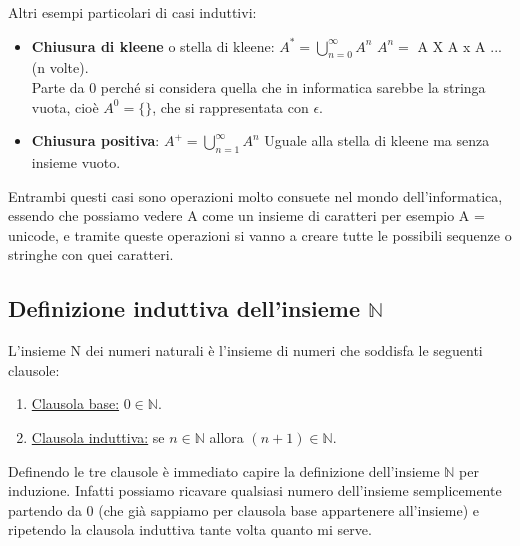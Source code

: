 \begin{example}
    Altri esempi particolari di casi induttivi:
    \begin{itemize}
        \item \textbf{Chiusura di kleene} o stella di kleene: $A^{*} = \bigcup\limits_{n=0}^{\infty} A^n$ \hspace{.3cm} $A^n =$ A X A x A ... (n volte).\\
        Parte da 0 perché si considera quella che in informatica sarebbe la stringa vuota, cioè $A^0 = \{\}$, che si rappresentata con $\epsilon$.
        \item \textbf{Chiusura positiva}: $A^{+} = \bigcup\limits_{n=1}^{\infty} A^n$ \hspace{.3cm} Uguale alla stella di kleene ma senza insieme vuoto.
    \end{itemize}
    Entrambi questi casi sono operazioni molto consuete nel mondo dell'informatica, essendo che possiamo vedere A come un insieme di caratteri per esempio A = unicode, e tramite queste operazioni si vanno a creare tutte le possibili sequenze o stringhe con quei caratteri.
\end{example}

\subsection{Definizione induttiva dell'insieme $\mathbb{N}$}
\begin{definition}\label{definizioni-induttiva-insieme-N}
    L’insieme N dei numeri naturali è l’insieme di numeri che soddisfa le seguenti clausole:
    \begin{enumerate}
        \item \underline{Clausola base:} $0 \in \mathbb{N}$.
        \item \underline{Clausola induttiva:} se $n \in \mathbb{N}$ allora $(n + 1) \in \mathbb{N}$.
    \end{enumerate}
\end{definition}
Definendo le tre clausole è immediato capire la definizione dell'insieme $\mathbb{N}$ per induzione. Infatti possiamo ricavare qualsiasi numero dell'insieme semplicemente partendo da 0 (che già sappiamo per clausola base appartenere all'insieme) e ripetendo la clausola induttiva tante volta quanto mi serve. 

